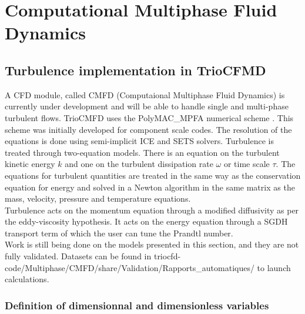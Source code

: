 \chapter{\label{sec:CMFD}Computational Multiphase Fluid Dynamics}
\section{Turbulence implementation in TrioCFMD}
A CFD module, called CMFD (Computaional Multiphase Fluid Dynamics) is currently under development and will be able to handle single and multi-phase turbulent flows. TrioCMFD uses the PolyMAC\_MPFA numerical scheme \cite{Gerschenfeld_PolyMAC2018, Gerschenfeld_PolyMAC2022}. This scheme was initially developed for component scale codes. The resolution of the equations is done using semi-implicit ICE and SETS solvers. Turbulence is treated through two-equation models. There is an equation on the turbulent kinetic energy $k$ and one on the turbulent dissipation rate $\omega$ or time scale $\tau$. The equations for turbulent quantities are treated in the same way as the conservation equation for energy and solved in a Newton algorithm in the same matrix as the mass, velocity, pressure and temperature equations. \\

Turbulence acts on the momentum equation through a modified diffusivity as per the eddy-viscosity hypothesis. It acts on the energy equation through a SGDH transport term of which the user can tune the Prandtl number. \\

Work is still being done on the models presented in this section, and they are not fully validated. Datasets can be found in triocfd-code/Multiphase/CMFD/share/Validation/Rapports\_automatiques/ to launch calculations.
\newpage

\subsection{Definition of dimensionnal and dimensionless variables}

